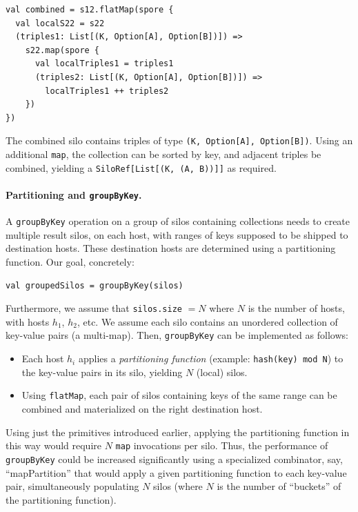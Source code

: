 \documentclass{jfp1}
\begin{document}
\begin{lstlisting}
val combined = s12.flatMap(spore {
  val localS22 = s22
  (triples1: List[(K, Option[A], Option[B])]) =>
    s22.map(spore {
      val localTriples1 = triples1
      (triples2: List[(K, Option[A], Option[B])]) =>
        localTriples1 ++ triples2
    })
})
\end{lstlisting}
\noindent
The combined silo contains triples of type \verb|(K, Option[A], Option[B])|.
Using an additional \verb|map|, the collection can be sorted by key, and
adjacent triples be combined, yielding a \texttt{SiloRef[List[(K, (A, B))]]} as
required.

\paragraph{Partitioning and \texttt{groupByKey}.}

A \verb|groupByKey| operation on a group of silos containing collections needs
to create multiple result silos, on each host, with ranges of keys supposed to
be shipped to destination hosts. These destination hosts are determined using a
partitioning function. Our goal, concretely:

\begin{lstlisting}
val groupedSilos = groupByKey(silos)
\end{lstlisting}
\noindent
Furthermore, we assume that \verb|silos.size| $= N$ where $N$ is the number of
hosts, with hosts $h_1$, $h_2$, etc. We assume each silo contains an unordered
collection of key-value pairs (a multi-map). Then, \verb|groupByKey| can be
implemented as follows:

\begin{itemize}
  \item Each host $h_i$ applies a {\em partitioning function} (example:
    \texttt{hash(key) mod N}) to the key-value pairs in its silo, yielding $N$
    (local) silos.

  \item Using \verb|flatMap|, each pair of silos containing keys of the same
    range can be combined and materialized on the right destination host.
\end{itemize}

Using just the primitives introduced earlier, applying the partitioning function
in this way would require $N$ \verb|map| invocations per silo. Thus, the
performance of \verb|groupByKey| could be increased significantly using a
specialized combinator, say, ``mapPartition'' that would apply a given
partitioning function to each key-value pair, simultaneously populating $N$
silos (where $N$ is the number of ``buckets'' of the partitioning function).
\end{document}

